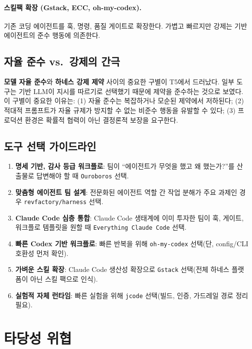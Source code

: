 \documentclass[11pt,a4paper]{article}
\newcommand{\tool}[1]{\texttt{#1}}
\begin{document}
\paragraph{스킬팩 확장 (Gstack, ECC, oh-my-codex).}
기존 코딩 에이전트를 훅, 명령, 품질 게이트로 확장한다.
가볍고 빠르지만 강제는 기반 에이전트의 준수 행동에 의존한다.

\subsection{자율 준수 vs.\ 강제의 간극}

\textbf{모델 자율 준수}와 \textbf{하네스 강제 제약} 사이의 중요한 구별이 T5에서 드러났다.
일부 도구는 기반 LLM이 지시를 따르기로 선택했기 때문에 제약을 준수하는 것으로 보였다.
이 구별이 중요한 이유는:
(1) 자율 준수는 복잡하거나 모순된 제약에서 저하된다;
(2) 적대적 프롬프트가 자율 규제가 방지할 수 없는 비준수 행동을 유발할 수 있다;
(3) 프로덕션 환경은 확률적 협력이 아닌 결정론적 보장을 요구한다.

\subsection{도구 선택 가이드라인}

\begin{enumerate}
  \item \textbf{명세 기반, 감사 등급 워크플로}: 팀이 ``에이전트가 무엇을 했고 왜 했는가?''를 산출물로 답변해야 할 때 \tool{Ouroboros} 선택.
  \item \textbf{맞춤형 에이전트 팀 설계}: 전문화된 에이전트 역할 간 작업 분해가 주요 과제인 경우 \tool{revfactory/harness} 선택.
  \item \textbf{Claude Code 심층 통합}: Claude Code 생태계에 이미 투자한 팀이 훅, 게이트, 워크플로 템플릿을 원할 때 \tool{Everything Claude Code} 선택.
  \item \textbf{빠른 Codex 기반 워크플로}: 빠른 반복을 위해 \tool{oh-my-codex} 선택(단, config/CLI 호환성 먼저 확인).
  \item \textbf{가벼운 스킬 확장}: Claude Code 생산성 확장으로 \tool{Gstack} 선택(전체 하네스 플랫폼이 아닌 스킬 팩으로 인식).
  \item \textbf{실험적 자체 런타임}: 빠른 실험을 위해 \tool{jcode} 선택(빌드, 인증, 가드레일 경로 정리 필요).
\end{enumerate}

\section{타당성 위협}
\label{sec:threats}
\end{document}
